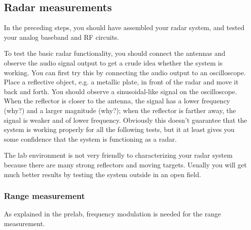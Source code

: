 \documentclass[letterpaper, 11pt]{article}
\begin{document}
\subsection{Radar measurements}

In the preceding steps, you should have assembled your radar system, and tested your analog baseband and RF circuits. 

To test the basic radar functionality, you should connect the antennas and observe the audio signal output to get a crude idea whether the system is working. You can first try this by connecting the audio output to an oscilloscope. Place a reflective object, e.g. a metallic plate, in front of the radar and move it back and forth. You should observe a sinusoidal-like signal on the oscilloscope. When the reflector is closer to the antenna, the signal has a lower frequency (why?) and a larger magnitude (why?); when the reflector is farther away, the signal is weaker and of lower frequency. Obviously this doesn't guarantee that the system is working properly for all the following tests, but it at least gives you some confidence that the system is functioning as a radar.

The lab environment is not very friendly to characterizing your radar system because there are many strong reflectors and moving targets. Usually you will get much better results by testing the system outside in an open field. 

\subsubsection{Range measurement}

As explained in the prelab, frequency modulation is needed for the range measurement. 
\end{document}
